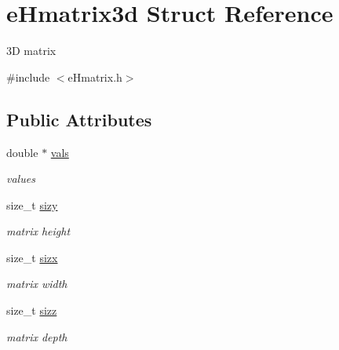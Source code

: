 \hypertarget{structeHmatrix3d}{\section{e\-Hmatrix3d Struct Reference}
\label{structeHmatrix3d}
}


3\-D matrix  




{\ttfamily \#include $<$e\-Hmatrix.\-h$>$}

\subsection*{Public Attributes}
\begin{DoxyCompactItemize}
\item 
\hypertarget{structeHmatrix3d_a6151612d617fc586ad55bcbc17c50bab}{double $\ast$ \hyperlink{structeHmatrix3d_a6151612d617fc586ad55bcbc17c50bab}{vals}}\label{structeHmatrix3d_a6151612d617fc586ad55bcbc17c50bab}

\begin{DoxyCompactList}\small\item\em values \end{DoxyCompactList}\item 
\hypertarget{structeHmatrix3d_a91e3877b5164f71085f7f8aecb7d75c1}{size\-\_\-t \hyperlink{structeHmatrix3d_a91e3877b5164f71085f7f8aecb7d75c1}{sizy}}\label{structeHmatrix3d_a91e3877b5164f71085f7f8aecb7d75c1}

\begin{DoxyCompactList}\small\item\em matrix height \end{DoxyCompactList}\item 
\hypertarget{structeHmatrix3d_afe29948aea1d1c37192f4d7a0f725025}{size\-\_\-t \hyperlink{structeHmatrix3d_afe29948aea1d1c37192f4d7a0f725025}{sizx}}\label{structeHmatrix3d_afe29948aea1d1c37192f4d7a0f725025}

\begin{DoxyCompactList}\small\item\em matrix width \end{DoxyCompactList}\item 
\hypertarget{structeHmatrix3d_a729ce2e2bede588050c791796c2bb3a5}{size\-\_\-t \hyperlink{structeHmatrix3d_a729ce2e2bede588050c791796c2bb3a5}{sizz}}\label{structeHmatrix3d_a729ce2e2bede588050c791796c2bb3a5}

\begin{DoxyCompactList}\small\item\em matrix depth \end{DoxyCompactList}\end{DoxyCompactItemize}


